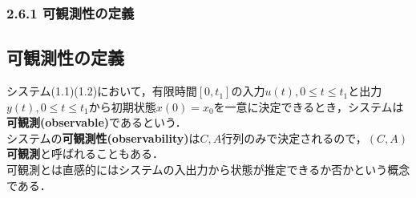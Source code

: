 \begin{frame}[t]
\frametitle{2.6.1 可観測性の定義}

\subsection{可観測性の定義}

システム(1.1)(1.2)において，有限時間$[0,t_1]$の入力$u(t),0 \leq t \leq t_1$と出力$y(t), 0 \leq t \leq t_1$から初期状態$x(0)=x_0$を一意に決定できるとき，システムは{\bf 可観測(observable)}であるという．
\\[3mm]

システムの{\bf 可観測性(observability)}は$C,A$行列のみで決定されるので，{\bf $(C,A)$可観測}と呼ばれることもある．\\[3mm]

可観測とは直感的にはシステムの入出力から状態が推定できるか否かという概念である．
\end{frame}

